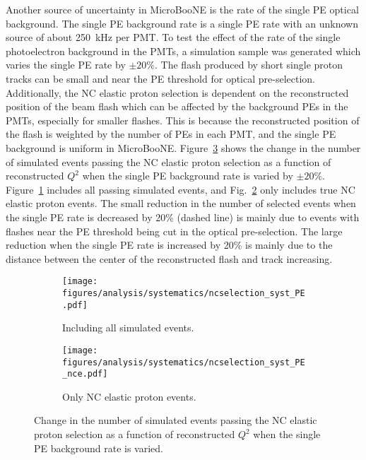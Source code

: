     Another source of uncertainty in MicroBooNE is the rate of the single PE
    optical background. The single PE background rate is a single PE rate with
    an unknown source of about 250~kHz per PMT. To test the effect of the rate
    of the single photoelectron background in the PMTs, a simulation sample was
    generated which varies the single PE rate by $\pm 20\%$. The flash produced
    by short single proton tracks can be small and near the PE threshold for
    optical pre-selection. Additionally, the NC elastic proton selection is
    dependent on the reconstructed position of the beam flash which can be
    affected by the background PEs in the PMTs, especially for smaller flashes.
    This is because the reconstructed position of the flash is weighted by the
    number of PEs in each PMT, and the single PE background is uniform in
    MicroBooNE. Figure~\ref{fig:spechange} shows the change in the number of
    simulated events passing the NC elastic proton selection as a function of
    reconstructed $Q^2$ when the single PE background rate is varied by $\pm
    20\%$. Figure~\ref{fig:spechangeall} includes all passing simulated events,
    and Fig.~\ref{fig:spechangence} only includes true NC elastic proton
    events. The small reduction in the number of selected events when the
    single PE rate is decreased by 20\% (dashed line) is mainly due to events
    with flashes near the PE threshold being cut in the optical pre-selection.
    The large reduction when the single PE rate is increased by 20\% is mainly
    due to the distance between the center of the reconstructed flash and track
    increasing. 
    \begin{figure}[h]
      \centering
      \begin{subfigure}[t]{2.8in}
        \texttt{[image: figures/analysis/systematics/ncselection\_syst\_PE.pdf]}
        \caption{Including all simulated events.}
        \label{fig:spechangeall}
      \end{subfigure}
      \hspace{2pt}
      \begin{subfigure}[t]{2.8in}
        \texttt{[image: figures/analysis/systematics/ncselection\_syst\_PE\_nce.pdf]}
        \caption{Only NC elastic proton events.}
        \label{fig:spechangence}
      \end{subfigure}
      \caption{Change in the number of simulated events passing the NC elastic
      proton selection as a function of reconstructed $Q^2$ when the single PE
      background rate is varied.}
      \label{fig:spechange}
    \end{figure}
